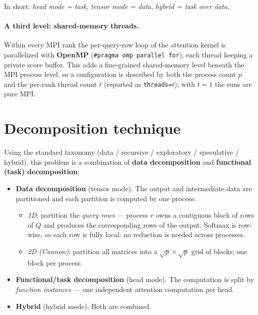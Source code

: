 \documentclass[11pt,a4paper]{article}
\newcommand{\code}[1]{\texttt{#1}}
\begin{document}
\noindent
In short: \emph{head mode = task}, \emph{tensor mode = data}, \emph{hybrid =
task over data}.

\paragraph{A third level: shared-memory threads.} Within every MPI rank the
per-query-row loop of the attention kernel is parallelized with \textbf{OpenMP}
(\code{\#pragma omp parallel for}), each thread keeping a private score buffer.
This adds a fine-grained shared-memory level beneath the MPI process level, so a
configuration is described by both the process count $p$ and the per-rank thread
count $t$ (reported as \code{threads=}$t$); with $t=1$ the runs are pure MPI.

\section{Decomposition technique}
\label{sec:decomp}
Using the standard taxonomy (data / recursive / exploratory / speculative /
hybrid), this problem is a combination of \textbf{data decomposition} and
\textbf{functional (task) decomposition}:

\begin{itemize}[leftmargin=1.4em]
\item \textbf{Data decomposition} (tensor mode). The output and intermediate
data are partitioned and each partition is computed by one process:
\begin{itemize}
  \item \emph{1D}: partition the \emph{query rows} --- process $r$ owns a
        contiguous block of rows of $Q$ and produces the corresponding rows of
        the output. Softmax is row-wise, so each row is fully local: no
        reduction is needed across processes.
  \item \emph{2D (Cannon)}: partition all matrices into a
        $\sqrt{p}\times\sqrt{p}$ grid of blocks; one block per process.
\end{itemize}
\item \textbf{Functional/task decomposition} (head mode). The computation is
split by \emph{function instances} --- one independent attention computation per
head.
\item \textbf{Hybrid} (hybrid mode). Both are combined.
\end{itemize}
\end{document}
